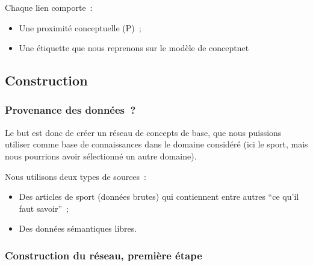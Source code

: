 \documentclass[a4paper,12pt]{article}
\begin{document}
Chaque lien comporte~:
\begin{itemize}
 \item Une proximité conceptuelle (P)~;
 \item Une étiquette que nous reprenons sur le modèle de conceptnet
\end{itemize}

\subsection{Construction}

\subsubsection{Provenance des données~?}

Le but est donc de créer un réseau de concepts de base, que nous puissions utiliser comme base de connaissances dans le domaine considéré (ici le sport, mais nous pourrions avoir sélectionné un autre domaine).

Nous utilisons deux types de sources~:
\begin{itemize}
 \item Des articles de sport (données brutes) qui contiennent entre autres ``ce qu'il faut savoir''~;
 \item Des données sémantiques libres.
\end{itemize}

\subsubsection{Construction du réseau, première étape}
\end{document}
